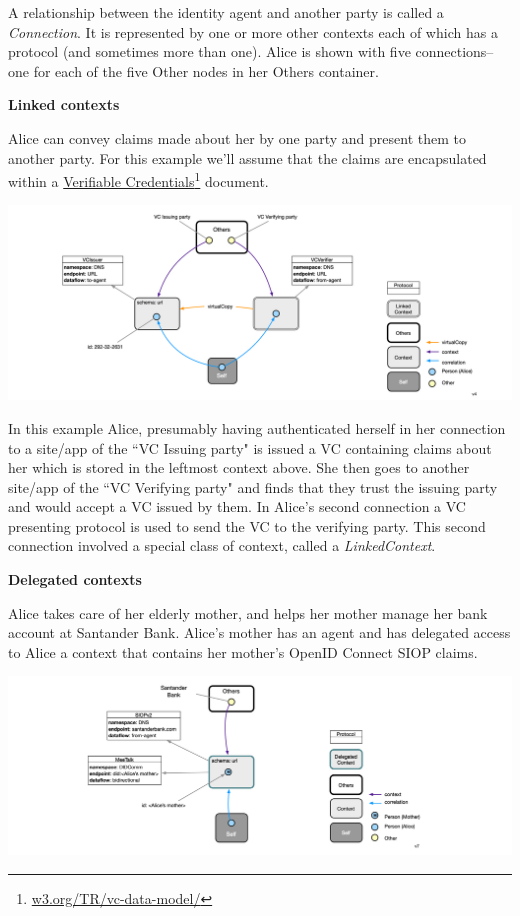 \documentclass[11pt, oneside]{article}   	%
\newcommand{\hyperfootnote}[1][]{\def\ArgI{{#1}}\hyperfootnoteRelay}
\newcommand\hyperfootnoteRelay[2][]{\href{#1#2}{\ArgI}\footnote{\href{#1#2}{#2}}}
\begin{document}
A relationship between the identity agent and another party is called a \emph{Connection}. It is represented by one or more other contexts each of which has a protocol (and sometimes more than one). Alice is shown with five connections--one for each of the five Other nodes in her Others container. 

\textbf{Linked contexts}

Alice can convey claims made about her by one party and present them to another party. For this example we'll assume that the claims are encapsulated within a \hyperfootnote[Verifiable Credentials][https://]{w3.org/TR/vc-data-model/} document. 

\includegraphics[width=\textwidth]{./images/linked-contexts.png}

In this example Alice, presumably having authenticated herself in her connection to a site/app of the ``VC Issuing party" is issued a VC containing claims about her which is stored in the leftmost context above. She then goes to another site/app of the ``VC Verifying party" and finds that they trust the issuing party and would accept a VC issued by them. In Alice's second connection a VC presenting protocol is used to send the VC to the verifying party. This second connection involved a special class of context, called a \emph{LinkedContext}. 

\textbf{Delegated contexts}

Alice takes care of her elderly mother, and helps her mother manage her bank account at Santander Bank. Alice's mother has an agent and has delegated access to Alice a context that contains her mother's OpenID Connect SIOP claims. 

\includegraphics[width=\textwidth]{./images/delegated-contexts.png}
\end{document}
